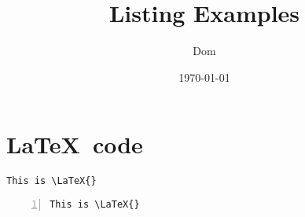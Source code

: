 \documentclass{article}
\title{Listing Examples}
\author{Dom}
\date{\today}
\begin{document}
    \section{\LaTeX\ code}

    \begin{lstlisting}[language={[LaTeX]TeX}]
This is \LaTeX{}
    \end{lstlisting}

    \begin{lstlisting}[language={[LaTeX]TeX},numbers=left]
This is \LaTeX{}
    \end{lstlisting}
\end{document}
